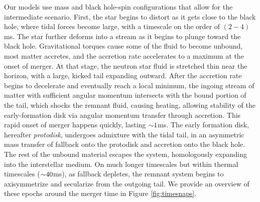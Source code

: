 Our models use mass and black hole-spin configurations that allow for the intermediate scenario.  
First, the star begins to distort as it gets close to the black hole, where tidal forces become large, with a timescale on the order of $(2-4)$ms.  
The star further deforms into a stream as it begins to plunge toward the black hole.  
Gravitational torques cause some of the fluid to become unbound, most matter accretes, and the accretion rate accelerates to a maximum at the onset of merger.  
At that stage, the neutron star fluid is stretched thin near the horizon, with a large, kicked tail expanding outward.
After the accretion rate begins to decelerate and eventually reach a local minimum, the ingoing stream of matter with sufficient angular momentum intersects with the bound portion of the tail, which shocks the remnant fluid, causing heating, allowing stability of the early-formation disk via angular momentum transfer through accretion.
This rapid onset of merger happens quickly, lasting $\mathord{\sim} 1$ms.
The early formation disk, hereafter \textit{protodisk}, undergoes admixture with the tidal tail, in an asymmetric mass transfer of fallback onto the protodisk and accretion onto the black hole.
The rest of the unbound material escapes the system, homologously expanding into the interstellar medium.
On much longer timescales but within thermal timescales ($\mathord{\sim} 40$ms), as fallback depletes, the remnant system begins to axisymmetrize and secularize from the outgoing tail.
We provide an overview of these epochs around the merger time in Figure \ref{fig:timesnaps}.

